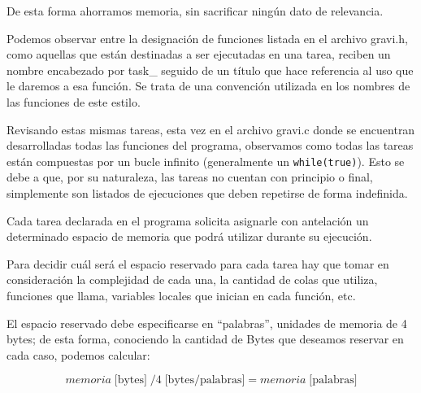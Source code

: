                     \par
                    
                    De esta forma ahorramos memoria, sin sacrificar ningún dato de relevancia.\par
                    Podemos observar entre la designación de funciones listada en el archivo gravi.h, como aquellas que están destinadas a ser ejecutadas en una tarea, reciben un nombre encabezado por task\_ seguido de un título que hace referencia al uso que le daremos a esa función. Se trata de una convención utilizada en los nombres de las funciones de este estilo.\par
                    Revisando estas mismas tareas, esta vez en el archivo gravi.c donde se encuentran desarrolladas todas las funciones del programa, observamos como todas las tareas están compuestas por un bucle infinito (generalmente un \texttt{while(true)}). Esto se debe a que, por su naturaleza, las tareas no cuentan con principio o final, simplemente son listados de ejecuciones que deben repetirse de forma indefinida.\par
                    Cada tarea declarada en el programa solicita asignarle con antelación un determinado espacio de memoria que podrá utilizar durante su ejecución.\par

                    
                    
                    Para decidir cuál será el espacio reservado para cada tarea hay que tomar en consideración la complejidad de cada una, la cantidad de colas que utiliza, funciones que llama, variables locales que inician en cada función, etc.\par
                    El espacio reservado debe especificarse en “palabras”, unidades de memoria de 4 bytes; de esta forma, conociendo la cantidad de Bytes que deseamos reservar en cada caso, podemos calcular:\par
                    
                    \begin{equation}
                        memoria \; \text{[bytes]} \; / 4 \; \text{[bytes/palabras]} = memoria \; \text{[palabras]}
                    \end{equation}

